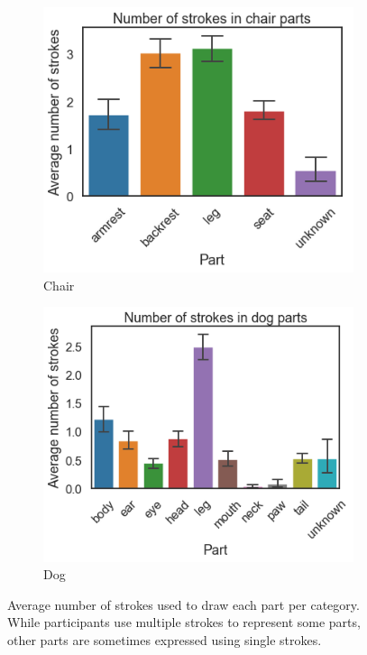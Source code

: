 \documentclass[10pt,letterpaper]{article}
\begin{document}
\begin{figure}[h]
\hfill
\begin{subfigure}[t]{0.2\textwidth}
\centering
\includegraphics[width=1.2\textwidth]{figures/chair_average_parts.png}
\caption{Chair}
\end{subfigure}
 \hfill
\begin{subfigure}[t]{0.2\textwidth}
\centering
\includegraphics[width=1.2\textwidth]{figures/dog_average_parts.png}
\caption{Dog}
\end{subfigure}
\caption{Average number of strokes used to draw each part per category. While participants use multiple strokes to represent some parts, other parts are sometimes expressed using single strokes.}
\label{strokesperpart}
\end{figure}
\end{document}
